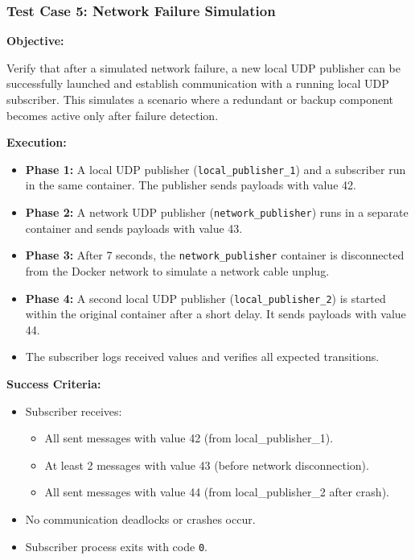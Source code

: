 \subsubsection{Test Case 5: Network Failure Simulation}

\textbf{Objective:}

\vspace{0.4em}
Verify that after a simulated network failure, a new local UDP publisher can be successfully launched and establish communication with a running local UDP subscriber. This simulates a scenario where a redundant or backup component becomes active only after failure detection.

\vspace{0.5em}
\textbf{Execution:}
\begin{itemize}
	\item \textbf{Phase 1:} A local UDP publisher (\texttt{local\_publisher\_1}) and a subscriber run in the same container. The publisher sends payloads with value 42.
	\item \textbf{Phase 2:} A network UDP publisher (\texttt{network\_publisher}) runs in a separate container and sends payloads with value 43.
	\item \textbf{Phase 3:} After 7 seconds, the \texttt{network\_publisher} container is disconnected from the Docker network to simulate a network cable unplug.
	\item \textbf{Phase 4:} A second local UDP publisher (\texttt{local\_publisher\_2}) is started within the original container after a short delay. It sends payloads with value 44.
	\item The subscriber logs received values and verifies all expected transitions.
\end{itemize}

\vspace{0.4em}
\textbf{Success Criteria:}
\begin{itemize}
	\item Subscriber receives:
	\begin{itemize}
		\item All sent messages with value 42 (from local\_publisher\_1).
		\item At least 2 messages with value 43 (before network disconnection).
		\item All sent messages with value 44 (from local\_publisher\_2 after crash).
	\end{itemize}
	\item No communication deadlocks or crashes occur.
	\item Subscriber process exits with code \texttt{0}.
\end{itemize}

